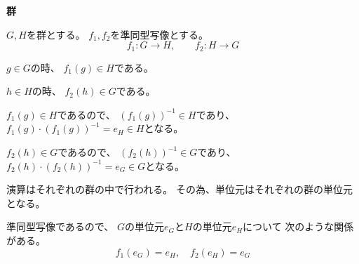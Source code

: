 \documentclass[12pt,b5paper]{ltjsarticle}
\begin{document}
\textbf{群}

$G,H$を群とする。
$f_1,f_2$を準同型写像とする。
\begin{equation}
 f_1:G\to H ,\qquad f_2:H\to G
\end{equation}

$g\in G$の時、
$f_1(g) \in H$である。

$h\in H$の時、
$f_2(h) \in G$である。


$f_1(g) \in H$であるので、
$(f_1(g))^{-1} \in H$であり、
$f_1(g)\cdot (f_1(g))^{-1} = e_H \in H$となる。


$f_2(h) \in G$であるので、
$(f_2(h))^{-1} \in G$であり、
$f_2(h)\cdot (f_2(h))^{-1} = e_G \in G$となる。

演算はそれぞれの群の中で行われる。
その為、単位元はそれぞれの群の単位元となる。

準同型写像であるので、
$G$の単位元$e_G$と$H$の単位元$e_H$について
次のような関係がある。
\begin{equation}
 f_1(e_G)=e_H,\quad f_2(e_H)=e_G
\end{equation}
\end{document}
